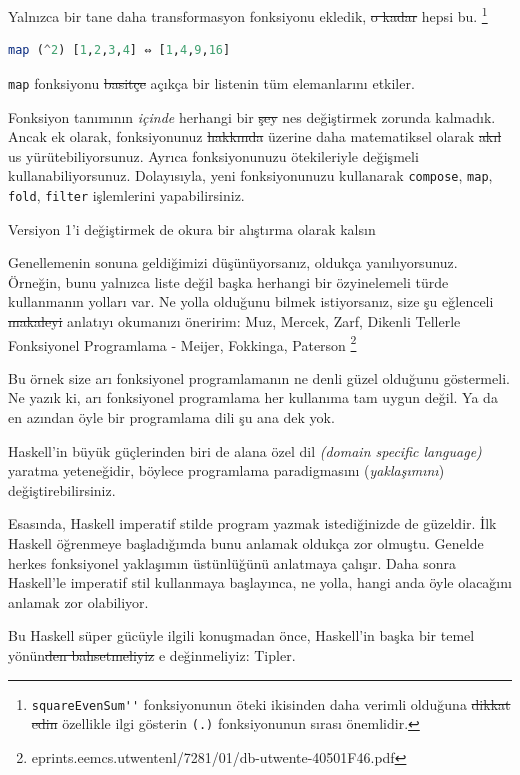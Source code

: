 \documentclass[a4paper,14pt,openany]{extbook} %
\let\emph\textit
\begin{document}
Yalnızca bir tane daha transformasyon fonksiyonu ekledik, \st{o kadar} hepsi bu.
\footnote{\lstinline!squareEvenSum''! fonksiyonunun öteki ikisinden daha
  verimli olduğuna \st{dikkat edin} özellikle ilgi gösterin \lstinline!(.)! fonksiyonunun sırası
  önemlidir.}

\begin{lstlisting}[language=Haskell]
  map (^2) [1,2,3,4] ⇔ [1,4,9,16]
\end{lstlisting}

\lstinline!map! fonksiyonu \st{basitçe} açıkça bir listenin tüm elemanlarını
etkiler.

Fonksiyon tanımının \emph{içinde} herhangi bir \st{şey} nes değiştirmek zorunda
kalmadık. Ancak ek olarak, fonksiyonunuz \st{hakkında} üzerine daha matematiksel olarak
\st{akıl} us yürütebiliyorsunuz. Ayrıca fonksiyonunuzu ötekileriyle değişmeli kullanabiliyorsunuz.
Dolayısıyla, yeni fonksiyonunuzu kullanarak
\lstinline!compose!, \lstinline!map!, \lstinline!fold!,
\lstinline!filter! işlemlerini yapabilirsiniz.

Versiyon 1'i değiştirmek de okura bir alıştırma olarak kalsın  %

Genellemenin sonuna geldiğimizi düşünüyorsanız, oldukça
yanılıyorsunuz. Örneğin, bunu yalnızca liste değil başka herhangi bir
özyinelemeli türde kullanmanın yolları var. Ne yolla olduğunu bilmek
istiyorsanız, size şu eğlenceli \st{makaleyi} anlatıyı okumanızı öneririm:
{\color{blue}Muz, Mercek, Zarf, Dikenli Tellerle Fonksiyonel Programlama - Meijer, Fokkinga, Paterson}
\footnote{eprints.eemcs.utwente\centerdot nl/7281/01/db-utwente-40501F46.pdf}

Bu örnek size arı fonksiyonel programlamanın ne denli güzel olduğunu
göstermeli. Ne yazık ki, arı fonksiyonel programlama her kullanıma tam
uygun değil. Ya da en azından öyle bir programlama dili şu ana dek yok.

Haskell'in büyük güçlerinden biri de alana özel dil \emph{(domain specific language)}
yaratma yeteneğidir, böylece programlama paradigmasını (\emph{yaklaşımını})
değiştirebilirsiniz.

Esasında, Haskell imperatif stilde program yazmak istediğinizde de
güzeldir. İlk Haskell öğrenmeye başladığımda bunu anlamak oldukça zor
olmuştu. Genelde herkes fonksiyonel yaklaşımın üstünlüğünü anlatmaya
çalışır. Daha sonra Haskell'le imperatif stil kullanmaya başlayınca,
ne yolla, hangi anda öyle olacağını anlamak zor olabiliyor.

Bu Haskell süper gücüyle ilgili konuşmadan önce, Haskell'in başka bir
temel yönün\st{den bahsetmeliyiz} e değinmeliyiz: Tipler.
\end{document}
